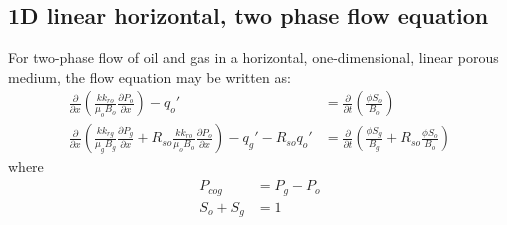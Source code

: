 


\subsection{1D linear horizontal, two phase flow equation} %
\label{sub:1d_linear_horizontal_two_phase_flow_equation}

\begin{question}
  For two-phase flow of oil and gas in a horizontal, one-dimensional, linear porous medium, the flow equation may be written as:
  \begin{align}
    \frac{\partial}{\partial x}\left(\frac{kk_{ro}}{\mu_{o}B_{o}}\frac{\partial P_{o}}{\partial x}\right)-q_{o}'
    &=\frac{\partial}{\partial t}\left(\frac{\phi S_{o}}{B_{o}}\right) \\
    \frac{\partial}{\partial x}\left(\frac{kk_{rg}}{\mu_{g}B_{g}}\frac{\partial P_{g}}{\partial x}+R_{so}\frac{kk_{ro}}{\mu_{o}B_{o}}\frac{\partial P_{o}}{\partial x}\right)-q_{g}'-R_{so}q_{o}'
    &=\frac{\partial}{\partial t}\left(\frac{\phi S_{g}}{B_{g}}+R_{so}\frac{\phi S_{o}}{B_{o}}\right)
  \end{align}
  where
  \begin{align}
    P_{cog} &= P_g - P_o \\
    S_o + S_g &= 1
  \end{align}
\end{question}


